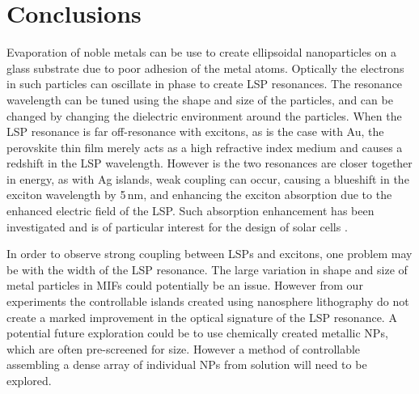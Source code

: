 \section{Conclusions}
Evaporation of noble metals can be use to create ellipsoidal nanoparticles on a glass substrate due to poor adhesion of the metal atoms. Optically the electrons in such particles can oscillate in phase to create LSP resonances. The resonance wavelength can be tuned using the shape and size of the particles, and can be changed by changing the dielectric environment around the particles. When the LSP resonance is far off-resonance with excitons, as is the case with Au, the perovskite thin film merely acts as a high refractive index medium and causes a redshift in the LSP wavelength. However is the two resonances are closer together in energy, as with Ag islands, weak coupling can occur, causing a blueshift in the exciton wavelength by 5\,nm, and enhancing the exciton absorption due to the enhanced electric field of the LSP. Such absorption enhancement has been investigated and is of particular interest for the design of solar cells \cite{Alemu2014, Zheng2011, Xu2013, Spinelli2012}.

In order to observe strong coupling between LSPs and excitons, one problem may be with the width of the LSP resonance. The large variation in shape and size of metal particles in MIFs could potentially be an issue. However from our experiments the controllable islands created using nanosphere lithography do not create a marked improvement in the optical signature of the LSP resonance. A potential future exploration could be to use chemically created metallic NPs, which are often pre-screened for size. However a method of controllable assembling a dense array of individual NPs from solution will need to be explored.